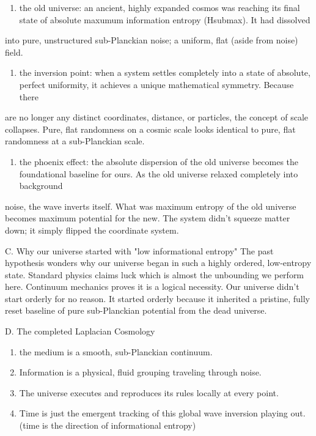 \begin{enumerate}
\item the old universe: an ancient, highly expanded cosmos was reaching its final state of absolute maxumum information entropy (Hsubmax). It had dissolved
\end{enumerate}

into pure, unstructured sub-Planckian noise; a uniform, flat (aside from noise) field.

\begin{enumerate}
\item the inversion point: when a system settles completely into a state of absolute, perfect uniformity, it achieves a unique mathematical symmetry. Because there
\end{enumerate}

are no longer any distinct coordinates, distance, or particles, the concept of scale collapses. Pure, flat randomness on a cosmic scale looks identical to pure, flat randomness at a sub-Planckian scale.

\begin{enumerate}
\item the phoenix effect: the absolute dispersion of the old universe becomes the foundational baseline for ours. As the old universe relaxed completely into background
\end{enumerate}

noise, the wave inverts itself. What was maximum entropy of the old universe becomes maximum potential for the new. The system didn't squeeze matter down; it simply flipped the coordinate system.

C. Why our universe started with "low informational entropy" The past hypothesis wonders why our universe began in such a highly ordered, low-entropy state. Standard physics claims luck which is almost the unbounding we perform here. Continuum mechanics proves it is a logical necessity. Our universe didn't start orderly for no reason. It started orderly because it inherited a pristine, fully reset baseline of pure sub-Planckian potential from the dead universe.

D. The completed Laplacian Cosmology

\begin{enumerate}
\item the medium is a smooth, sub-Planckian continuum.
\item Information is a physical, fluid grouping traveling through noise.
\item The universe executes and reproduces its rules locally at every point.
\item Time is just the emergent tracking of this global wave inversion playing out. (time is the direction of informational entropy)
\end{enumerate}

